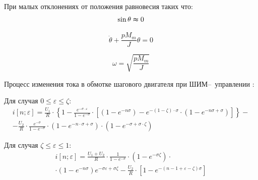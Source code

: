 При малых отклонениях от положения равновесия таких что:
\begin{equation}
    \sin{\theta} \thickapprox 0
\end{equation}

\begin{equation}
    \label{rotor_like_harmonical_oscilator_equation}
    \ddot{\theta} + \frac{p M_{m}}{J} \theta = 0
\end{equation}

\begin{equation}
    \label{friquent_for_rotor_self_oscilating}
    \omega = \sqrt{ \frac{p M_{m}}{J} }
\end{equation}

Процесс изменения тока в обмотке шагового двигателя при ШИМ--~уп\-рав\-лен\-ии
\cite[гл. 6.4, стр. 239]{Chilikin}:

Для случая $0 \le \varepsilon \le \zeta$:
\begin{equation}
    \label{winding_current_with_pwm_control_1}
    \begin{split}
    i[ n; \varepsilon ] = \frac{ U_1 }{ R }
                            \cdot \left\{ 1
                                     - \frac { e^{ -\sigma \cdot \varepsilon } } { 1 - e^{-\sigma} }
                                            \cdot \left[ (1 - e^{-n\sigma})
                                                    - e^{ -(1 - \zeta) \cdot \sigma }
                                                        \cdot ( 1 - e^{-n\sigma + \sigma} )
                                                  \right]
                                  \right\} - \\
                        - \frac{ U_2 }{ R }
                            \cdot \frac {e^{-\sigma}} {1 - e^{-\sigma}}
                            \cdot ( 1 - e^{ -n \cdot \sigma + \sigma } )
                            \cdot ( 1 - e^{ -\sigma + \sigma \cdot \zeta } )
    \end{split}
\end{equation}

Для случая $\zeta \le \varepsilon \le 1$:
\begin{equation}
    \label{winding_current_with_pwm_control_0}
    \begin{split}
    i[n; \varepsilon] =
        \frac{ U_{1} + U_{2} }{ R }
            \cdot \frac{ 1 }{ 1 - e^{-\sigma} }
            \cdot (1 - e^{-\sigma\zeta}) \cdot \\
            \cdot (1 - e^{-n\sigma})e^{-\sigma\varepsilon + \sigma\zeta}
        - \frac{ U_{2} }{ R }
            \cdot [ 1 - e^{ -( n - 1 + \varepsilon - \zeta ) \sigma } ]
    \end{split}
\end{equation}

